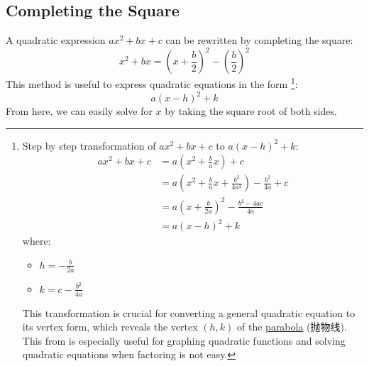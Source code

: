 
\subsection{Completing the Square}
A quadratic expression $ax^2 + bx + c$ can be rewritten by completing the square:
\begin{equation}
    x^2 + bx = \left(x + \frac{b}{2}\right)^2 - \left(\frac{b}{2}\right)^2
\end{equation}
This method is useful to express quadratic equations in the form \footnote{Step by step transformation of $ax^2 + bx + c$ to
$a(x - h)^2 + k$:
\begin{equation*}
    \begin{aligned}
        ax^2 + bx + c &= a\left(x^2 + \frac{b}{a}x\right) + c \\
        &= a\left(x^2 + \frac{b}{a}x + \frac{b^2}{4a^2}\right) - \frac{b^2}{4a} + c \\
        &= a\left(x + \frac{b}{2a}\right)^2 - \frac{b^2 - 4ac}{4a} \\
        &= a(x - h)^2 + k
    \end{aligned}
\end{equation*}
where:
\begin{itemize}
    \item $h = -\frac{b}{2a}$
    \item $k = c - \frac{b^2}{4a}$
\end{itemize}
This transformation is crucial for converting a general quadratic equation to its vertex form, which reveals the vertex $(h, k)$
of the \underline{parabola} (抛物线). This from is especially useful for graphing quadratic functions and solving quadratic
equations when factoring is not easy.}:
\begin{equation}
    a(x - h)^2 + k
\end{equation}
From here, we can easily solve for $x$ by taking the square root of both sides.